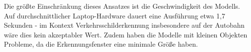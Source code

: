 \documentclass[runningheads]{llncs}
\begin{document}
Die größte Einschränkung dieses Ansatzes ist die Geschwindigkeit des Modells. Auf durchschnittlicher Laptop-Hardware dauert eine Ausführung etwa 1,7 Sekunden - im Kontext Verkehrsschilderkennung insbesondere auf der Autobahn wäre dies kein akzeptabler Wert. Zudem haben die Modelle mit kleinen Objekten Probleme, da die Erkennungsfenster eine minimale Größe haben.




\end{document}
